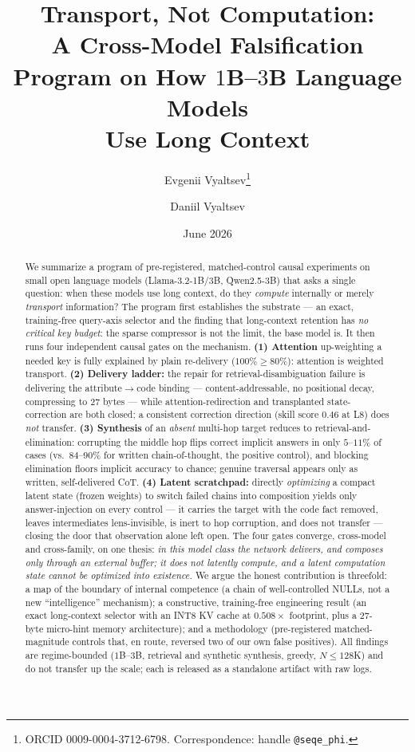 \documentclass[11pt]{article}
\title{\bfseries Transport, Not Computation:\\
A Cross-Model Falsification Program on How $1$B--$3$B Language Models\\
Use Long Context}
\author[1]{Evgenii Vyaltsev\thanks{ORCID 0009-0004-3712-6798. Correspondence: handle \texttt{@seqe\_phi}.}}
\author[1]{Daniil Vyaltsev}
\affil[1]{Independent Researcher}
\date{June 2026}
\begin{document}
\maketitle

\begin{abstract}
\noindent
We summarize a program of pre-registered, matched-control causal experiments on
small open language models (Llama-3.2-1B/3B, Qwen2.5-3B) that asks a single question:
when these models use long context, do they \emph{compute} internally or merely
\emph{transport} information? The program first establishes the substrate --- an exact,
training-free query-axis selector and the finding that long-context retention has
\emph{no critical key budget}: the sparse compressor is not the limit, the base model
is. It then runs four independent causal gates on the mechanism. \textbf{(1) Attention}
up-weighting a needed key is fully explained by plain re-delivery ($100\%\ge 80\%$):
attention is weighted transport. \textbf{(2) Delivery ladder:} the repair for
retrieval-disambiguation failure is delivering the attribute$\to$code binding ---
content-addressable, no positional decay, compressing to $27$ bytes --- while
attention-redirection and transplanted state-correction are both closed; a consistent
correction direction (skill score $0.46$ at L8) does \emph{not} transfer.
\textbf{(3) Synthesis} of an \emph{absent} multi-hop target reduces to
retrieval-and-elimination: corrupting the middle hop flips correct implicit answers in
only $5$--$11\%$ of cases (vs.\ $84$--$90\%$ for written chain-of-thought, the positive
control), and blocking elimination floors implicit accuracy to chance; genuine
traversal appears only as written, self-delivered CoT. \textbf{(4) Latent scratchpad:}
directly \emph{optimizing} a compact latent state (frozen weights) to switch failed
chains into composition yields only answer-injection on every control --- it carries
the target with the code fact removed, leaves intermediates lens-invisible, is inert to
hop corruption, and does not transfer --- closing the door that observation alone left
open. The four gates converge, cross-model and cross-family, on one thesis: \emph{in
this model class the network delivers, and composes only through an external buffer; it
does not latently compute, and a latent computation state cannot be optimized into
existence.} We argue the honest contribution is threefold: a map of the boundary of
internal competence (a chain of well-controlled NULLs, not a new ``intelligence''
mechanism); a constructive, training-free engineering result (an exact long-context
selector with an INT8 KV cache at $0.508\times$ footprint, plus a $27$-byte
micro-hint memory architecture); and a methodology (pre-registered matched-magnitude
controls that, en route, reversed two of our own false positives). All findings are
regime-bounded ($1$B--$3$B, retrieval and synthetic synthesis, greedy, $N\le128$K) and
do not transfer up the scale; each is released as a standalone artifact with raw logs.
\end{abstract}
\end{document}
